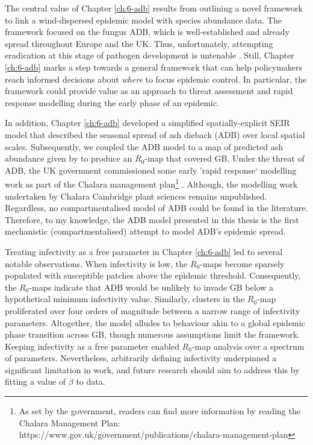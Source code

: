 The central value of Chapter \ref{ch:6-adb} results from outlining a novel framework to link a wind-dispersed epidemic model with species abundance data. 
The framework focused on the fungus ADB, which is well-established and already spread throughout Europe and the UK.
Thus, unfortunately, attempting eradication at this stage of pathogen development is untenable \cite{ash-dieback-costs}. 
Still, Chapter \ref{ch:6-adb} marks a step towards a general framework that can help policymakers reach informed decisions about \textit{where} to focus epidemic control.
In particular, the framework could provide value as an approach to threat assessment and rapid response modelling during the early phase of an epidemic.

In addition, Chapter \ref{ch:6-adb} developed a simplified spatially-explicit SEIR model that described the seasonal spread of ash dieback (ADB) over local spatial scales. Subsequently, we coupled the ADB model to a map of predicted ash abundance given by \cite{hill.data} to produce an $R_0$-map that covered GB.
Under the threat of ADB, the UK government commissioned some early 'rapid response` modelling work as part of the Chalara management plan\footnote{As set by the government, readers can find more information by reading the Chalara Management Plan: https://www.gov.uk/government/publications/chalara-management-plan} \cite{defra2013chalara}. Although, the modelling work undertaken by  Chalara Cambridge plant sciences remains unpublished. Regardless, no compartmentalised model of ADB could be found in the literature. Therefore, to my knowledge, the ADB model presented in this thesis is the first mechanistic (compartmentalised) attempt to model ADB's epidemic spread.

Treating infectivity as a free parameter in Chapter \ref{ch:6-adb} led to several notable observations. When infectivity is low, the $R_0$-maps become sparsely populated with susceptible patches above the epidemic threshold. Consequently, the $R_0$-maps indicate that ADB would be unlikely to invade GB below a hypothetical minimum infectivity value. Similarly, clusters in the $R_0$-map proliferated over four orders of magnitude between a narrow range of infectivity parameters. Altogether, the model alludes to behaviour akin to a global epidemic phase transition across GB, though numerous assumptions limit the framework. Keeping infectivity as a free parameter enabled $R_0$-map analysis over a spectrum of parameters. Nevertheless, arbitrarily defining infectivity underpinned a significant limitation in work, and future research should aim to address this by fitting a value of $\beta$ to data.

